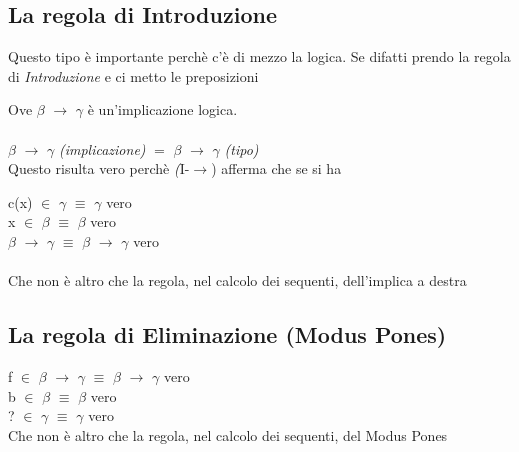 \subsection{La regola di Introduzione}
\label{subsec:osservazioni-introduzione-funzione}
Questo tipo \`e importante perch\`e c'\`e di mezzo la logica. Se difatti prendo la regola di \textit{Introduzione} e ci metto le preposizioni
\begin{prooftree}
\end{prooftree}
\noindent
Ove $\beta$ $\rightarrow$ $\gamma$ \`e un'implicazione logica.\\\\
\noindent 
$\beta$ $\rightarrow$ $\gamma$ \textit{(implicazione)} \quad $=$ \quad $\beta$ $\rightarrow$ $\gamma$ \textit{(tipo)}\\
Questo risulta vero perch\`e \textit(I-$\rightarrow$) afferma che se si ha
\begin{prooftree}
\end{prooftree}
\noindent
c(x) $\in$ $\gamma$ $\equiv$ $\gamma$ vero\\
x $\in$ $\beta$ $\equiv$ $\beta$ vero\\
$\beta$ $\rightarrow$ $\gamma$ $\equiv$ $\beta$ $\rightarrow$ $\gamma$ vero\\\\
\noindent
Che non \`e altro che la regola, nel calcolo dei sequenti, dell'implica a destra
\begin{prooftree}
\end{prooftree}

\subsection{La regola di Eliminazione (Modus Pones)}
\label{subsec:osservazioni-eliminazione-funzione}
\begin{prooftree}
\end{prooftree}
\noindent
f $\in$ $\beta$ $\rightarrow$ $\gamma$ $\equiv$ $\beta$ $\rightarrow$ $\gamma$ vero\\
b $\in$ $\beta$ $\equiv$ $\beta$ vero\\
? $\in$ $\gamma$ $\equiv$ $\gamma$ vero\\
Che non \`e altro che la regola, nel calcolo dei sequenti, del Modus Pones
\begin{prooftree}
\end{prooftree} 


